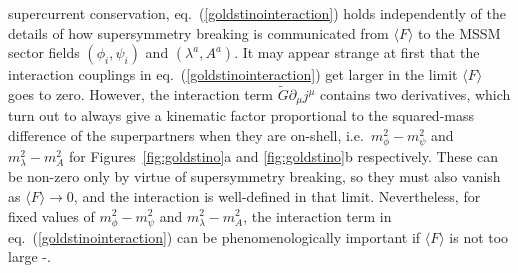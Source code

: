 \documentclass[11pt]{article}
\def\stilde{\widetilde}
\begin{document}
%
supercurrent conservation, eq.~(\ref{goldstinointeraction}) holds
independently of the details of how supersymmetry breaking is communicated
from $\langle F \rangle$ to the MSSM sector fields $(\phi_i,\psi_i)$ and
$(\lambda^a, A^a)$. It may appear strange at first that the interaction
couplings in eq.~(\ref{goldstinointeraction}) get larger in the limit
$\langle F \rangle$ goes to zero. However, the interaction term $\stilde G
\partial_\mu j^\mu$ contains two derivatives, which turn out to always
give a kinematic factor proportional to the squared-mass difference of the
superpartners when they are on-shell, i.e.~$m_{\phi}^2 - m_{\psi}^2$
and $m^2_{\lambda} - m_{A}^2$ for Figures~\ref{fig:goldstino}a and
\ref{fig:goldstino}b respectively. These can be non-zero only by virtue of
supersymmetry breaking, so they must also vanish as $\langle F\rangle
\rightarrow 0$, and the interaction is well-defined in that limit.
Nevertheless, for fixed values of $m_{\phi}^2 - m_{\psi}^2$ and
$m^2_{\lambda} - m_{A}^2$, the interaction term in
eq.~(\ref{goldstinointeraction}) can be phenomenologically important if
$\langle F \rangle $ is not too large
\cite{Fayetsupercurrent}-\cite{AKKMM2}.
\end{document}
